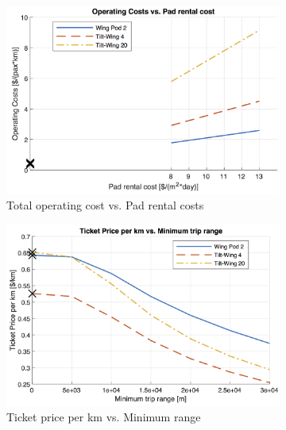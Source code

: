 \begin{figure}[H]
\begin{subfigure}[t]{0.33\textwidth}
    \centering
    \includegraphics[width=\textwidth]{Figures/cost_oper.png}
    \captionsetup{justification=centering}
    \caption{Total operating cost vs. Pad rental costs}
    \label{fig:sens01}
\end{subfigure}
\begin{subfigure}[t]{0.33\textwidth}
    \centering
    \includegraphics[width=\textwidth]{Figures/minRange_TPrice_perkmNOPAD.png}
    \captionsetup{justification=centering}
    \caption{Ticket price per km vs. Minimum range}
    \label{fig:sens02}
\end{subfigure}
\begin{subfigure}[t]{0.33\textwidth}
    \centering

\end{subfigure}
\end{figure}
